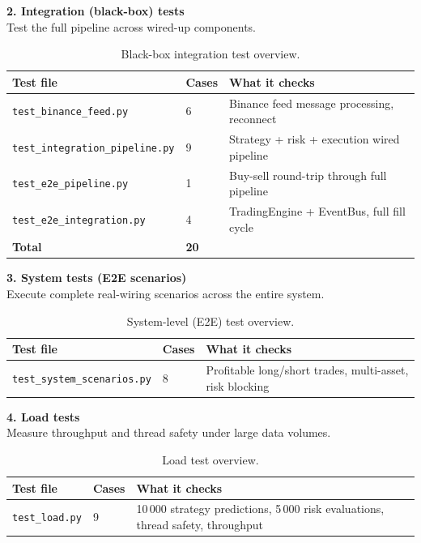 \noindent\textbf{2. Integration (black-box) tests}\\
Test the full pipeline across wired-up components.

\begin{table}[H]
  \centering
  \small
  \begin{tabular}{|l|l|p{6.5cm}|}
    \hline
    \textbf{Test file} & \textbf{Cases} & \textbf{What it checks} \\
    \hline\hline
    \texttt{test\_binance\_feed.py}        & 6 & Binance feed message processing, reconnect \\
    \texttt{test\_integration\_pipeline.py}& 9 & Strategy + risk + execution wired pipeline \\
    \texttt{test\_e2e\_pipeline.py}        & 1 & Buy-sell round-trip through full pipeline \\
    \texttt{test\_e2e\_integration.py}     & 4 & TradingEngine + EventBus, full fill cycle \\
    \hline
    \textbf{Total} & \textbf{20} & \\
    \hline
  \end{tabular}
  \caption{Black-box integration test overview.}
  \label{tab:integration_tests}
\end{table}

\noindent\textbf{3. System tests (E2E scenarios)}\\
Execute complete real-wiring scenarios across the entire system.

\begin{table}[H]
  \centering
  \small
  \begin{tabular}{|l|l|p{6.5cm}|}
    \hline
    \textbf{Test file} & \textbf{Cases} & \textbf{What it checks} \\
    \hline\hline
    \texttt{test\_system\_scenarios.py} & 8 & Profitable long/short trades, multi-asset, risk blocking \\
    \hline
  \end{tabular}
  \caption{System-level (E2E) test overview.}
  \label{tab:system_tests}
\end{table}

\noindent\textbf{4. Load tests}\\
Measure throughput and thread safety under large data volumes.

\begin{table}[H]
  \centering
  \small
  \begin{tabular}{|l|l|p{6.5cm}|}
    \hline
    \textbf{Test file} & \textbf{Cases} & \textbf{What it checks} \\
    \hline\hline
    \texttt{test\_load.py} & 9 & 10\,000 strategy predictions, 5\,000 risk evaluations, thread safety, throughput \\
    \hline
  \end{tabular}
  \caption{Load test overview.}
  \label{tab:load_tests}
\end{table}

